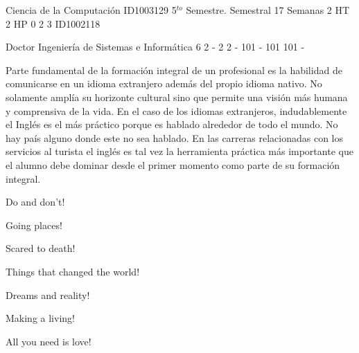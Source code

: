 \documentclass[a4paper,8pt]{article}
\begin{document}
\setNombreProfesor{}
\setGradoProfesorAbreviado{}
\sylabusHeader

\academicaTable
{Ciencia de la Computación} %
{ID1003129} %
{5$^{to}$ Semestre.} %
{Semestral} %
{17 Semanas} %
{2 HT} %
{2 HP} %
{0} %
{}  %
{2} %
{3} %
{ID1002118} %

\administrativaTable
{Doctor} %
{Ingeniería de Sistemas e Informática} %
{6} %
{2} %
{-} %
{2} %
{2} %
{-} %
{101} %
{-} %
{101} %
{101} %
{-} %


\begin{fundamentacion}
Parte fundamental de la formación integral de un profesional es la habilidad de comunicarse en un idioma extranjero además del propio idioma nativo. No solamente amplía su horizonte cultural sino que permite una visión más humana y comprensiva de la vida. En el caso de los idiomas extranjeros, indudablemente el Inglés es el 
más práctico porque es hablado alrededor de todo el mundo. No hay país alguno donde este no sea hablado. En las carreras relacionadas con los servicios al turista el inglés es tal vez la herramienta práctica más importante que el alumno debe dominar desde el primer momento como parte de su formación integral.

\end{fundamentacion}

\begin{sumilla}
\item Do and don't!
\item Going places!
\item Scared to death!
\item Things that changed the world!
\item Dreams and reality!
\item Making a living!
\item All you need is love!

\end{sumilla}
\end{document}
